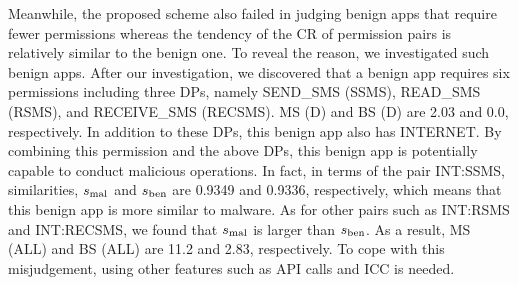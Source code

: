 \documentclass{ieeeaccess}
\begin{document}
Meanwhile, the proposed scheme also failed in judging benign apps that require fewer permissions whereas the tendency of the CR of permission pairs is relatively similar to the benign one.
To reveal the reason, we investigated such benign apps.
After our investigation, we discovered that a benign app requires six permissions including three DPs, namely SEND\_SMS (SSMS), READ\_SMS (RSMS), and RECEIVE\_SMS (RECSMS).
MS (D) and BS (D) are 2.03 and 0.0, respectively.
In addition to these DPs, this benign app also has INTERNET.
By combining this permission and the above DPs, this benign app is potentially capable to conduct malicious operations.
In fact, in terms of the pair INT:SSMS, similarities, $s_{\mathrm{mal}}$ and $s_{\mathrm{ben}}$ are 0.9349 and 0.9336, respectively, which means that this benign app is more similar to malware.
As for other pairs such as INT:RSMS and INT:RECSMS, we found that $s_{\mathrm{mal}}$ is larger than $s_{\mathrm{ben}}$.
As a result, MS (ALL) and BS (ALL) are 11.2 and 2.83, respectively.
To cope with this misjudgement, using other features such as API calls and ICC is needed.



\end{document}
